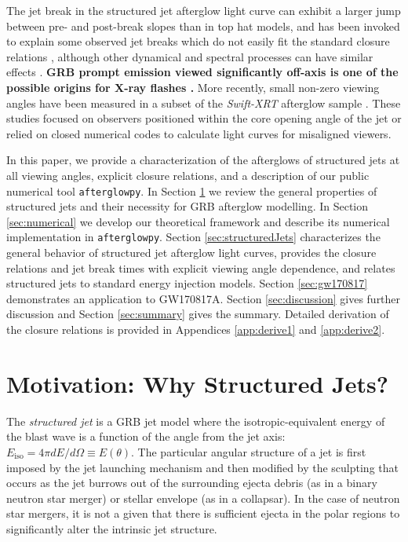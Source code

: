 \documentclass[twocolumn]{aastex62}
\newcommand{\gwbns}{GW170817A}
\newcommand{\afterglowpy}{{\tt afterglowpy}}
\newcommand{\swiftXRT}{{\em Swift-XRT}}
\newcommand{\Eiso}{\ensuremath{E_{\mathrm{iso}}}}
\begin{document}
The jet break in the structured jet afterglow light curve can exhibit a larger jump between pre- and post-break slopes than in top hat models, and has been invoked to explain some observed jet breaks which do not easily fit the standard closure relations \citep{Panaitescu:2005aa, Panaitescu:2005ab}, although other dynamical and spectral processes can have similar effects \citep{Piro:2005aa, Corsi:2006aa}.  {\bf GRB prompt emission viewed significantly off-axis is one of the possible origins for X-ray flashes \citep{Ioka:2001aa, Yamazaki:2002aa, Yamazaki:2003aa, Zhang:2004aa, Dai:2005aa, Peng:2005aa, DAlessio:2006aa}.  }More recently, small non-zero viewing angles have been measured in a subset of the \swiftXRT{} afterglow sample \citep{Ryan:2015aa, Zhang:2015aa, Troja:2016aa}.  These studies focused on observers positioned within the core opening angle of the jet or relied on closed numerical codes to calculate light curves for misaligned viewers.  

In this paper, we provide a characterization of the afterglows of structured jets at all viewing angles, explicit closure relations, and a description of our  public numerical tool \afterglowpy{}. In Section \ref{sec:motivation} we review the general properties of structured jets and their necessity for GRB afterglow modelling.  In Section \ref{sec:numerical} we develop our theoretical framework and describe its numerical implementation in \afterglowpy{}.  Section \ref{sec:structuredJets} characterizes the general behavior of structured jet afterglow light curves, provides the closure relations and jet break times with explicit viewing angle dependence, and relates structured jets to standard energy injection models.  Section \ref{sec:gw170817} demonstrates an application to \gwbns{}. Section \ref{sec:discussion} gives further discussion and Section \ref{sec:summary} gives the summary.  Detailed derivation of the closure relations is provided in Appendices \ref{app:derive1} and \ref{app:derive2}.


%
%


\section{Motivation: Why Structured Jets?}\label{sec:motivation}

The \emph{structured jet} is a GRB jet model where the isotropic-equivalent energy of the blast wave is a function of the angle from the jet axis: $\Eiso = 4\pi dE/d\Omega \equiv E(\theta)$. The particular angular structure of a jet is first imposed by the jet launching mechanism and then modified by the sculpting that occurs as the jet burrows out of the surrounding ejecta debris (as in a binary neutron star merger) or stellar envelope (as in a collapsar).  In the case of neutron star mergers, it is not a given that there is sufficient ejecta in the polar regions to significantly alter the intrinsic jet structure.
\end{document}
